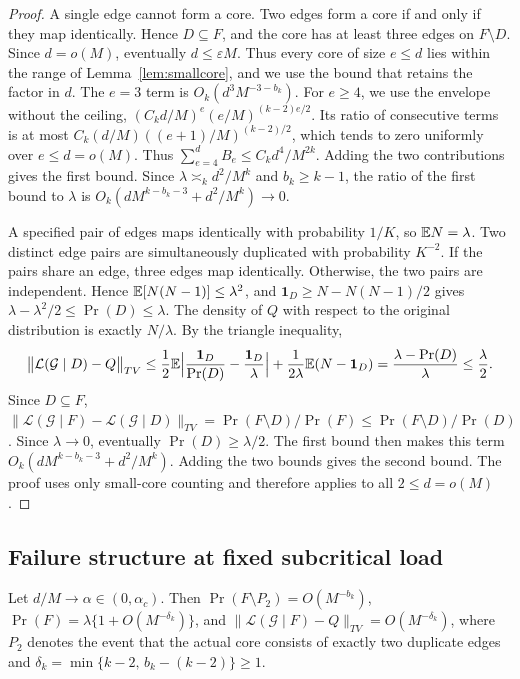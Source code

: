 \begin{proof}
A single edge cannot form a core. Two edges form a core if and only if they map identically. Hence $D\subseteq F$, and the core has at least three edges on $F\setminus D$. Since $d=o(M)$, eventually $d\le\varepsilon M$. Thus every core of size $e\le d$ lies within the range of Lemma~\ref{lem:smallcore}, and we use the bound that retains the factor in $d$. The $e=3$ term is $O_k(d^3M^{-3-b_k})$. For $e\ge4$, we use the envelope without the ceiling, $(C_kd/M)^e(e/M)^{(k-2)e/2}$. Its ratio of consecutive terms is at most $C_k(d/M)((e+1)/M)^{(k-2)/2}$, which tends to zero uniformly over $e\le d=o(M)$. Thus $\sum_{e=4}^dB_e\le C_kd^4/M^{2k}$. Adding the two contributions gives the first bound. Since $\lambda\asymp_kd^2/M^k$ and $b_k\ge k-1$, the ratio of the first bound to $\lambda$ is $O_k(dM^{k-b_k-3}+d^2/M^k)\to0$.

A specified pair of edges maps identically with probability $1/K$, so $\mathbb E N=\lambda$. Two distinct edge pairs are simultaneously duplicated with probability $K^{-2}$. If the pairs share an edge, three edges map identically. Otherwise, the two pairs are independent. Hence $\mathbb E[N(N-1)]\le\lambda^2$, and $\mathbf1_D\ge N-N(N-1)/2$ gives $\lambda-\lambda^2/2\le\Pr(D)\le\lambda$. The density of $Q$ with respect to the original distribution is exactly $N/\lambda$. By the triangle inequality,
\[
\bigl\|\mathcal L(\mathcal G\mid D)-Q\bigr\|_{TV}\le\frac12\mathbb E\Bigl|\frac{\mathbf1_D}{\Pr(D)}-\frac{\mathbf1_D}{\lambda}\Bigr|+\frac1{2\lambda}\mathbb E(N-\mathbf1_D)=\frac{\lambda-\Pr(D)}{\lambda}\le\frac\lambda2.
\]
Since $D\subseteq F$, $\|\mathcal L(\mathcal G\mid F)-\mathcal L(\mathcal G\mid D)\|_{TV}=\Pr(F\setminus D)/\Pr(F)\le\Pr(F\setminus D)/\Pr(D)$. Since $\lambda\to0$, eventually $\Pr(D)\ge\lambda/2$. The first bound then makes this term $O_k(dM^{k-b_k-3}+d^2/M^k)$. Adding the two bounds gives the second bound. The proof uses only small-core counting and therefore applies to all $2\le d=o(M)$.
\end{proof}

\subsection{Failure structure at fixed subcritical load}
\begin{lemma}\label{lem:propL}
Let $d/M\to\alpha\in(0,\alpha_c)$. Then $\Pr(F\setminus P_2)=O(M^{-b_k})$, $\Pr(F)=\lambda\{1+O(M^{-\delta_k})\}$, and $\|\mathcal L(\mathcal G\mid F)-Q\|_{TV}=O(M^{-\delta_k})$, where $P_2$ denotes the event that the actual core consists of exactly two duplicate edges and $\delta_k=\min\{k-2,\,b_k-(k-2)\}\ge1$.
\end{lemma}

